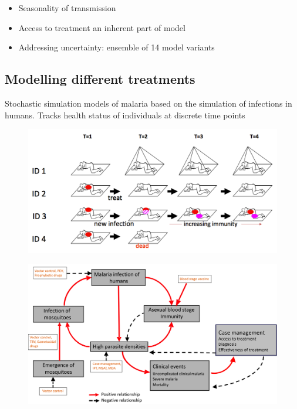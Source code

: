 \documentclass[]{scrartcl}
\begin{document}
\begin{itemize}
\item Seasonality of transmission
\item Access to treatment an inherent part of model
\item Addressing uncertainty: ensemble of 14 model variants

\end{itemize}

\subsection{Modelling different treatments}

Stochastic simulation models of malaria based on the simulation of infections in humans. Tracks health status of individuals at discrete time points

\begin{figure}
\includegraphics[width=\textwidth]{images/malariatreatment.png}
\end{figure}

\begin{figure}
\includegraphics[width=\textwidth]{images/accesstotreatment.png}
\end{figure}
\end{document}
